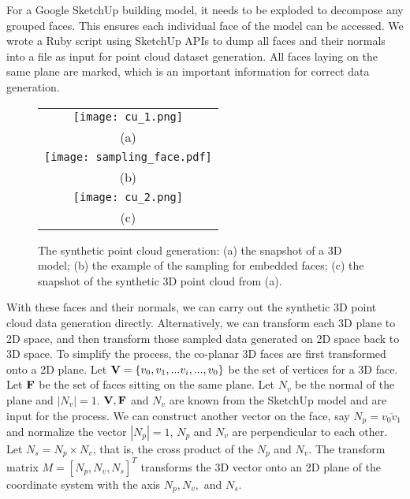 

For a Google SketchUp building model, it needs to be exploded to decompose
any grouped faces.
This ensures each individual face of the model can be accessed.
We wrote a Ruby script using SketchUp APIs to dump all faces
and their normals into a file as input for point cloud dataset generation.
All faces laying on the same plane are marked, which is an important
information for correct data generation.


\begin{figure}[htbp]
\begin{center}
\begin{tabular}{c}
	\texttt{[image: cu\_1.png]} \\
	(a) \\
        \texttt{[image: sampling\_face.pdf]} \\
	(b) \\
	\texttt{[image: cu\_2.png]} \\
	(c)
\end{tabular}
\end{center}
\caption{
The synthetic point cloud generation:
(a) the snapshot of a 3D model;
(b) the example of the sampling for embedded faces;
(c) the snapshot of the synthetic 3D point cloud from (a).
}
\label{fig:syn_data}
\end{figure}

With these faces and their normals,
 we can carry out the synthetic 3D point cloud data generation directly.
Alternatively, we can transform each 3D plane to 2D space, and then
transform those sampled data generated on 2D space back to 3D space.
To simplify the process, the co-planar 3D faces are first transformed onto a 2D plane.
Let ${\bf V} = \{v_0, v_1, ... v_i, ..., v_0\}$ be the set of vertices for a 3D face.
Let ${\bf F}$ be the set of faces sitting on the same plane.
Let $N_v$ be the normal of the plane and $|N_v| = 1$.
${\bf V, F }$ and $N_v$ are known from the SketchUp model and are input for the process.
We can construct another vector on the face, say $N_p = \overline{v_0v_1}$ and
normalize the vector $|N_p| = 1$, $N_p$ and $N_v$ are perpendicular to each other.
Let $N_s = N_p \times N_v$, that is, the cross product of the $N_p$ and $N_v$.
The transform matrix $M = [N_p, N_v, N_s]^T$ transforms the 3D vector
onto an 2D plane of the coordinate system with the axis $N_p, N_v,$ and $N_s$.

